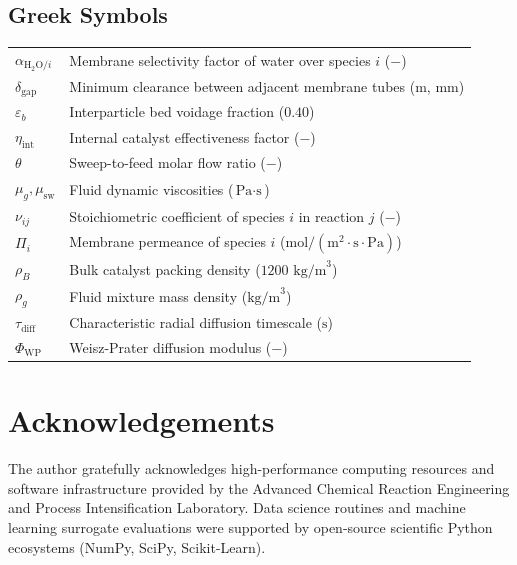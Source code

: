 \documentclass[12pt,a4paper]{article}
\begin{document}
\subsection*{Greek Symbols}
\noindent
\begin{tabular}{ll}
$\alpha_{\text{H}_2\text{O}/i}$ & Membrane selectivity factor of water over species $i$ ($-$) \\
$\delta_{\text{gap}}$ & Minimum clearance between adjacent membrane tubes ($\text{m}$, $\text{mm}$) \\
$\varepsilon_b$ & Interparticle bed voidage fraction ($0.40$) \\
$\eta_{\text{int}}$ & Internal catalyst effectiveness factor ($-$) \\
$\theta$ & Sweep-to-feed molar flow ratio ($-$) \\
$\mu_g, \mu_{\text{sw}}$ & Fluid dynamic viscosities ($\text{Pa}\cdot\text{s}$) \\
$\nu_{ij}$ & Stoichiometric coefficient of species $i$ in reaction $j$ ($-$) \\
$\Pi_i$ & Membrane permeance of species $i$ ($\text{mol}/(\text{m}^2\cdot\text{s}\cdot\text{Pa})$) \\
$\rho_B$ & Bulk catalyst packing density ($1200\text{ kg/m}^3$) \\
$\rho_g$ & Fluid mixture mass density ($\text{kg/m}^3$) \\
$\tau_{\text{diff}}$ & Characteristic radial diffusion timescale ($\text{s}$) \\
$\Phi_{\text{WP}}$ & Weisz-Prater diffusion modulus ($-$)
\end{tabular}

\section*{Acknowledgements}
The author gratefully acknowledges high-performance computing resources and software infrastructure provided by the Advanced Chemical Reaction Engineering and Process Intensification Laboratory. Data science routines and machine learning surrogate evaluations were supported by open-source scientific Python ecosystems (NumPy, SciPy, Scikit-Learn).
\end{document}
